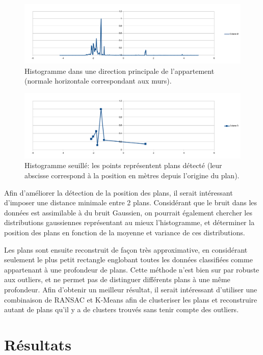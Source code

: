 \documentclass{article}
\begin{document}
\begin{figure}[H]
\centering
\includegraphics[width=\columnwidth]{../distribution_along_normal.png}
\caption{Histogramme dans une direction principale de l'appartement (normale horizontale correspondant aux murs). }
\end{figure}
\begin{figure}[H]
\centering
\includegraphics[width=\columnwidth]{../distribution_along_normal_max.png}
\caption{Histogramme seuillé: les points représentent plans détecté (leur abscisse correspond à la position en mètres depuis l'origine du plan).}
\end{figure}


Afin d'améliorer la détection de la position des plans, il serait intéressant d'imposer une distance minimale entre 2 plans. Considérant que le bruit dans les données est assimilable à 
du bruit Gaussien, on pourrait également chercher les distributions gaussiennes représentant au mieux l'histogramme, et déterminer la position des plans en fonction de la moyenne et variance de ces distributions.

Les plans sont ensuite reconstruit de façon très approximative, en considérant seulement le plus petit rectangle englobant toutes les données classifiées comme appartenant à une profondeur de plans. Cette méthode n'est bien sur par robuste aux outliers, et ne permet pas de distinguer différents plans à une même profondeur. Afin d'obtenir un meilleur résultat, il serait intéressant d'utiliser une combinaison de RANSAC et K-Means afin de clusteriser les plans 
et reconstruire autant de plans qu'il y a de clusters trouvés sans tenir compte des outliers.


\section{Résultats}
\end{document}
